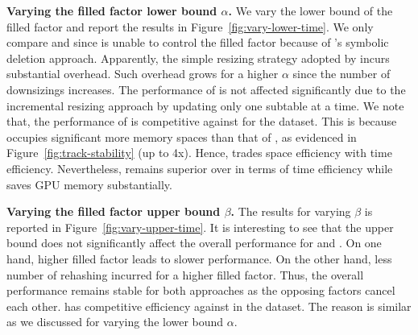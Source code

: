 \vspace{1mm}\noindent\textbf{Varying the filled factor lower bound $\alpha$.}
We vary the lower bound of the filled factor and report the results in Figure~\ref{fig:vary-lower-time}. 
We only compare \megakv and \voter since \slab is unable to control the filled factor because of \slab's symbolic deletion approach. 
Apparently, the simple resizing strategy adopted by \megakv incurs substantial overhead. Such overhead grows for a higher $\alpha$ since the number of downsizings increases. The performance of \voter is not affected significantly due to the incremental resizing approach by updating only one subtable at a time. We note that, the performance of \megakv is competitive against \voter for the \dsali dataset. This is because \megakv occupies significant more memory spaces than that of \voter, as evidenced in Figure~\ref{fig:track-stability} (up to 4x). Hence, \megakv trades space efficiency with time efficiency.
Nevertheless, \voter remains superior over \megakv in terms of time efficiency while saves GPU memory substantially. 



\vspace{1mm}\noindent\textbf{Varying the filled factor upper bound $\beta$.}
The results for varying $\beta$ is reported in Figure~\ref{fig:vary-upper-time}. 
It is interesting to see that the upper bound does not significantly affect the overall performance for \megakv and \voter. 
On one hand, higher filled factor leads to slower  performance. On the other hand, less number of rehashing incurred for a higher filled factor. Thus, the overall performance remains stable for both approaches as the opposing factors cancel each other. \megakv has competitive efficiency against \voter in the \dsali dataset. The reason is similar as we discussed for varying the lower bound $\alpha$.







